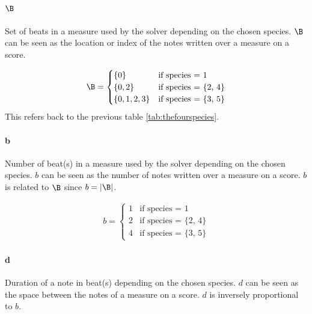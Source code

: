 \paragraph{$\B$} Set of beats in a measure used by the solver depending on the chosen species. $\B$ can be seen as the location or index of the notes written over a measure on a score.

\begin{equation}
    \begin{gathered}
        \B = \begin{cases}
            \{0\} & \text{if species = 1}\\
            \{0, 2\} & \text{if species = \{2, 4\}}\\
            \{0, 1, 2, 3\} & \text{if species = \{3, 5\}}
        \end{cases}
    \end{gathered}
\end{equation}
This refers back to the previous table \ref{tab:thefourspecies}.

\paragraph{b} Number of beat(s) in a measure used by the solver depending on the chosen species. $b$ can be seen as the number of notes written over a measure on a score. $b$ is related to $\B$ since $b = |\B|$.

\begin{equation}
    \begin{gathered}
        b = \begin{cases}
            1 & \text{if species = 1}\\
            2 & \text{if species = \{2, 4\}}\\
            4 & \text{if species = \{3, 5\}}
        \end{cases}
    \end{gathered}
\end{equation}

\paragraph{d} Duration of a note in beat(s) depending on the chosen species. $d$ can be seen as the space between the notes of a measure on a score. $d$ is inversely proportional to $b$.

